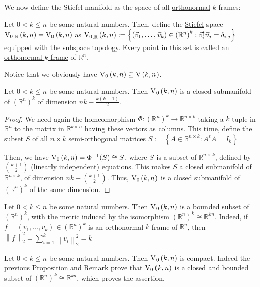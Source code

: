 We now define the Stiefel manifold as the space of all \ul{orthonormal} $k$-frames:
\begin{definition} Let $0<k\leq n$ be some natural numbers. Then, define the \ul{Stiefel} space $\StO{k}{n}{\mathbb{R}}=\StO{k}{n}$ as
$\StO{k}{n}{\mathbb{R}}:=\left\{\left(\vec{v}_1,\ldots,\vec{v}_k\right)\in{\left(\mathbb{R}^n\right)}^k:\vec{v}_i^t\vec{v}_j=\delta_{i,j}\right\}$
equipped with the subspace topology. Every point in this set is called an \ul{orthonormal $k$-frame} of $\mathbb{R}^n$.
\end{definition}
Notice that we obviously have $\StO{k}{n}\subseteq\St{k}{n}$.

\begin{proposition}\label{prop:StO_dim_closed} Let $0<k\leq n$ be some natural numbers. Then $\StO{k}{n}$ is a closed submanifold of ${\left(\mathbb{R}^n\right)}^k$ of dimension $nk-\frac{k(k+1)}{2}$.
\end{proposition}
\begin{proof}
We need again the homeomorphism $\Phi:{\left(\mathbb{R}^n\right)}^k\to\mathbb{R}^{n\times k}$ taking a $k$-tuple in $\mathbb{R}^n$ to the matrix in $\mathbb{R}^{k\times n}$ having these vectors as columns. This time, define the subset $S$ of all $n\times k$ semi-orthogonal matrices
$S:=\left\{A\in\mathbb{R}^{n\times k}:A^t A=I_k\right\}$

Then, we have
$\StO{k}{n}=\Phi^{-1}(S)\cong S$,
where $S$ is a subset of $\mathbb{R}^{n\times k}$, defined by $\binom{k+1}{2}$ (linearly independent) equations. This makes $S$ a closed submanifold of $\mathbb{R}^{n\times k}$, of dimension $nk-\binom{k+1}{2}$. Thus, $\StO{k}{n}$ is a closed submanifold of ${\left(\mathbb{R}^n\right)}^k$ of the same dimension.
\end{proof}
\begin{remark} Let $0<k\leq n$ be some natural numbers. Then $\StO{k}{n}$ is a bounded subset of ${\left(\mathbb{R}^n\right)}^k$, with the metric induced by the isomorphism ${\left(\mathbb{R}^n\right)}^k\cong\mathbb{R}^{kn}$. Indeed, if $f=(v_1,\ldots,v_k)\in{\left(\mathbb{R}^n\right)}^k$ is an orthonormal $k$-frame of $\mathbb{R}^n$, then
$\left\|f\right\|_2^2=\sum_{i=1}^k\left\|v_i\right\|_2^2=k$
\end{remark}

\begin{lemma}\label{lem:StO_compact} Let $0<k\leq n$ be some natural numbers. Then $\StO{k}{n}$ is compact. Indeed the previous Proposition and Remark prove that $\StO{k}{n}$ is a closed and bounded subset of ${\left(\mathbb{R}^n\right)}^k\cong\mathbb{R}^{kn}$, which proves the assertion.
\end{lemma}

